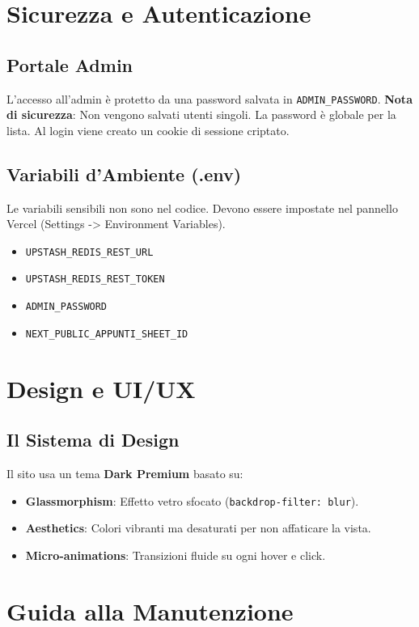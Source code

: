 \documentclass[11pt,a4paper,oneside]{book}
\begin{document}
\chapter{Sicurezza e Autenticazione}
\section{Portale Admin}
L'accesso all'admin è protetto da una password salvata in \texttt{ADMIN\_PASSWORD}. 
\textbf{Nota di sicurezza}: Non vengono salvati utenti singoli. La password è globale per la lista. Al login viene creato un cookie di sessione criptato.

\section{Variabili d'Ambiente (.env)}
Le variabili sensibili non sono nel codice. Devono essere impostate nel pannello Vercel (Settings -> Environment Variables).
\begin{itemize}
    \item \texttt{UPSTASH\_REDIS\_REST\_URL}
    \item \texttt{UPSTASH\_REDIS_REST\_TOKEN}
    \item \texttt{ADMIN\_PASSWORD}
    \item \texttt{NEXT\_PUBLIC\_APPUNTI\_SHEET\_ID}
\end{itemize}

\chapter{Design e UI/UX}
\section{Il Sistema di Design}
Il sito usa un tema \textbf{Dark Premium} basato su:
\begin{itemize}
    \item \textbf{Glassmorphism}: Effetto vetro sfocato (\texttt{backdrop-filter: blur}).
    \item \textbf{Aesthetics}: Colori vibranti ma desaturati per non affaticare la vista.
    \item \textbf{Micro-animations}: Transizioni fluide su ogni hover e click.
\end{itemize}

\chapter{Guida alla Manutenzione}
\end{document}
